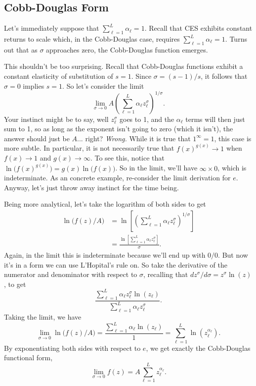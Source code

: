 \documentclass[12pt]{article}
\theoremstyle{definition}
\begin{document}
\subsection{Cobb-Douglas Form}
Let's immediately suppose that  $\sum_{\ell=1}^L \alpha_{\ell}=1$. Recall that CES exhibits constant returns to scale which, in the Cobb-Douglas case, requires $\sum_{\ell=1}^L \alpha_{\ell}=1$.  Turns out that as $\sigma$ approaches zero, the Cobb-Douglas function emerges. 

This shouldn't be too surprising. Recall that Cobb-Douglas functions exhibit a constant elasticity of substitution of $s=1$. Since $\sigma = (s-1)/s$, it follows that $\sigma=0$ implies $s=1$. So let's consider the limit
	\[	\lim_{\sigma \rightarrow 0} A \left(\sum_{\ell = 1}^L \alpha_{\ell} z_{\ell}^{\sigma} \right)^{1 / \sigma}.\]
	Your instinct might be to say, well $z_{\ell}^{\sigma}$ goes to 1, and the $\alpha_{\ell}$ terms will then just sum to 1, so as long as the exponent isn't going to zero (which it isn't), the answer should just be $A$... right? \emph{Wrong.} While it is true that $1^\infty=1$, this case is more subtle. In particular, it is not necessarily true that $f(x)^{g(x)} \rightarrow 1$ when $f(x) \rightarrow 1$ and $g(x) \rightarrow \infty$. To see this, notice that $\ln\big ( f(x)^{g(x)} \big) = g(x) \ln\big ( f(x) \big)$. So in the limit, we'll have $\infty \times 0$, which is indeterminate. As an concrete example, re-consider the limit derivation for $e$. Anyway, let's just throw away instinct for the time being. 

Being more analytical, let's take the logarithm of both sides to get
\begin{align*}
	\ln \big( f(z)/A \big) &= \ln \left[  \left(\sum_{\ell = 1}^L \alpha_{\ell} z_{\ell}^{\sigma} \right)^{1 / \sigma} \right]\\
		&=  \frac{  \ln \left[ \sum_{\ell = 1}^L \alpha_{\ell} z_{\ell}^{\sigma} \right]}{\sigma}.
\end{align*}
Again, in the limit this is indeterminate because we'll end up with $0/0$. But now it's in a form we can use L'Hopital's rule on. So take the derivative of the numerator and denominator with respect to $\sigma$, recalling that $dz^{\sigma}/d\sigma =z^{\sigma} \ln( z)$, to get
	\[\frac{\sum_{\ell =1}^L \alpha_{\ell} z_{\ell}^\sigma \ln(z_{\ell}) }{\sum_{\ell = 1}^L \alpha_{\ell} z_{\ell}^{\sigma}}.	\]
Taking the limit, we have
	\[ \lim_{\sigma \rightarrow 0} \ln\big( f(z)/A \big) = \frac{\sum_{\ell=1}^L \alpha_{\ell}\ln(z_{\ell}) }{1}= \sum_{\ell=1}^L \ln(z_{\ell}^{\alpha_{\ell}}).   \]
By exponentiating both sides with respect to $e$, we get exactly the Cobb-Douglas functional form,
	\[\lim_{\sigma \rightarrow 0} f(z) = A \sum_{\ell=1}^L z_{\ell}^{\alpha_{\ell}}. \]
	
\end{document}
